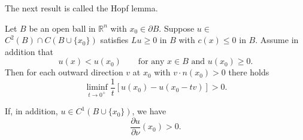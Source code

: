 The next result is called the Hopf lemma.

\begin{theorem}\label{hanlin:maxprin-theorem-2-6}
Let $B$ be an open ball in $\mathbb{R}^n$ with $x_0 \in \partial B$. Suppose $u \in$
$C^2(B)\cap C(B\cup\{x_0\})$ satisfies $Lu \ge 0$ in $B$ with $c(x) \le 0$ in $B$. Assume in addition
that
\[
u(x) < u(x_0) \qquad \text{for any } x \in B \text{ and } u(x_0) \ge 0.
\]
Then for each outward direction $v$ at $x_0$ with $v \cdot n(x_0) > 0$ there holds
\[
\liminf_{t \to 0^+} \frac{1}{t}[u(x_0) - u(x_0 - tv)] > 0.
\]
\end{theorem}
\begin{remark}\label{hanlin:maxprin-remark-2-7}
If, in addition, $u \in C^1(B\cup\{x_0\})$, we have
\[
\frac{\partial u}{\partial \nu}(x_0) > 0.
\]
\end{remark}
